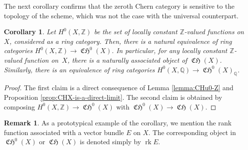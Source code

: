 \documentclass[11pt]{article}
\theoremstyle{plain}
\newtheorem{corollary}[theorem]{Corollary}
\theoremstyle{definition}
\newtheorem{remark}[theorem]{Remark}
\newcommand{\QBbb}{\mathbb Q}
\newcommand{\ZBbb}{\mathbb Z}
\DeclareMathOperator{\CHfrak}{\mathfrak{CH}}
\DeclareMathOperator{\rk}{rk}
\begin{document}
The next corollary confirms that the zeroth Chern category is sensitive to the topology of the scheme, which was not the case with the universal counterpart.

\begin{corollary}\label{cor:CH0-H0}
Let $H^{0}(X,\ZBbb)$ be the set of locally constant $\ZBbb$-valued functions on~$X$, considered as a ring category. Then, there is a natural equivalence of ring categories $H^{0}(X,\ZBbb)\to\CHfrak^{0}(X)$. In particular, for any locally constant $\ZBbb$-valued function on~$X$, there is a naturally associated object of $\CHfrak(X)$. Similarly, there is an equivalence of ring categories $H^{0}(X,\QBbb)\to\CHfrak^{0}(X)_{\QBbb}$.
\end{corollary}
\begin{proof}
The first claim is a direct consequence of Lemma \ref{lemma:CHu0-Z} and Proposition \ref{prop:CHX-is-a-direct-limit}. The second claim is obtained by composing $H^{0}(X,\ZBbb)\to \CHfrak^{0}(X)$ with $\CHfrak^{0}(X)\to\CHfrak(X)$.
\end{proof}

\begin{remark}
As a prototypical example of the corollary, we mention the rank function associated with a vector bundle $E$ on $X$. The corresponding object in $\CHfrak^{0}(X)$ or $\CHfrak(X)$ is denoted simply by $\rk E$.
\end{remark}
\end{document}
